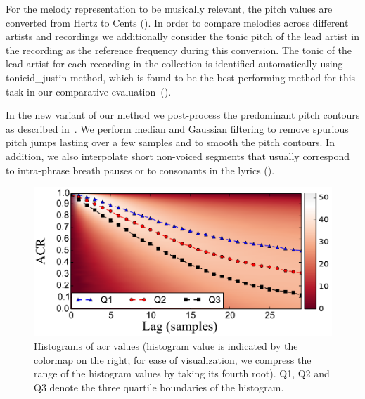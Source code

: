 For the melody representation to be musically relevant, the pitch values are converted from Hertz to Cents (). In order to compare melodies across different artists and recordings we additionally consider the tonic pitch of the lead artist in the recording as the reference frequency during this conversion. The tonic of the lead artist for each recording in the collection is identified automatically using \acrshort{tonicid_justin} method, which is found to be the best performing method for this task in our comparative evaluation~().

In the new variant of our method we post-process the predominant pitch contours as described in~. We perform median and Gaussian filtering to remove spurious pitch jumps lasting over a few samples and to smooth the pitch contours. In addition, we also interpolate short non-voiced segments that usually correspond to intra-phrase breath pauses or to consonants in the lyrics (). 


\begin{figure}
	\begin{center}
		\includegraphics[width=\figSizeEightyFive]{ch06_patterns/figures/discovery/ACRHistogram.pdf}
	\end{center}
	\caption[Histogram of autocorrelation of the pitch subsequences for different lags]{Histograms of \gls{acr} values (histogram value is indicated by the colormap on the right; for ease of visualization, we compress the range of the histogram values by taking its fourth root). Q1, Q2 and Q3 denote the three quartile boundaries of the histogram. }
	\label{fig:ACRHistogram}
\end{figure}


